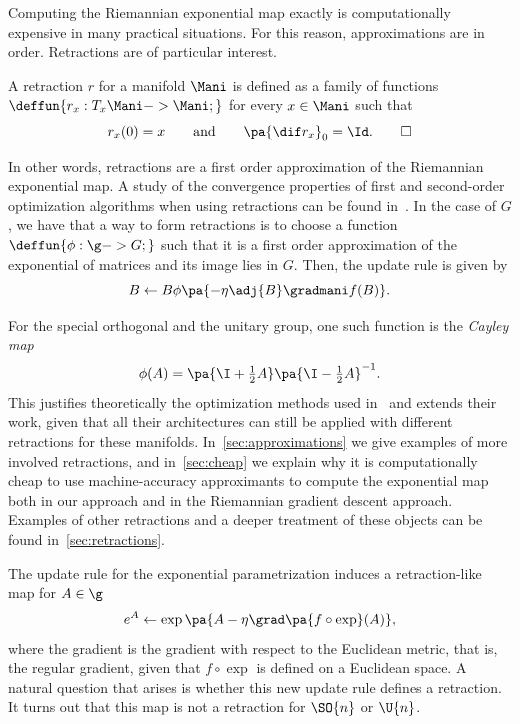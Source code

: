 Computing the Riemannian exponential map exactly is computationally expensive in many practical situations. For this reason, approximations are in order. Retractions are of particular interest.

\begin{definition}[Retraction]
A retraction $r$ for a manifold $\Mani$ is defined as a family of functions $\deffun{r_x : T_x \Mani -> \Mani;}$ for every $x \in \Mani$ such that
\[
    r_x(0) = x \qquad \text{and} \qquad \pa{\dif r_x}_0 = \Id.\qedhere
\]
\end{definition}

In other words, retractions are a first order approximation of the Riemannian exponential map. A study of the convergence properties of first and second-order optimization algorithms when using retractions can be found in~\cite{boumal2016global}. In the case of $G$, we have that a way to form retractions is to choose a function $\deffun{\phi : \g -> G;}$ such that it is a first order approximation of the exponential of matrices and its image lies in $G$. Then, the update rule is given by
\[
    B \gets B\phi\pa{-\eta\adj{B}\gradmani f(B)}.
\]

\begin{remark}
    For the special orthogonal and the unitary group, one such function is the \emph{Cayley map}
    \[
        \phi(A) = \pa{\I + \tfrac{1}{2}A}\pa{\I - \tfrac{1}{2}A}^{-1}.
    \]
    This justifies theoretically the optimization methods used in~\cite{wisdom2016full,vorontsov2017orthogonality} and extends their work, given that all their architectures can still be applied with different retractions for these manifolds. In~\ref{sec:approximations} we give examples of more involved retractions, and in~\ref{sec:cheap} we explain why it is computationally cheap to use machine-accuracy approximants to compute the exponential map both in our approach and in the Riemannian gradient descent approach. Examples of other retractions and a deeper treatment of these objects can be found in~\ref{sec:retractions}.
\end{remark}

The update rule for the exponential parametrization induces a retraction-like map for $A \in \g$
\[
    e^A \gets \exp\pa{A - \eta\grad\pa{f \circ \exp}(A)},
\]
where the gradient is the gradient with respect to the Euclidean metric, that is, the regular gradient, given that $f \circ \exp$ is defined on a Euclidean space. A natural question that arises is whether this new update rule defines a retraction. It turns out that this map is not a retraction for $\SO{n}$ or $\U{n}$.

